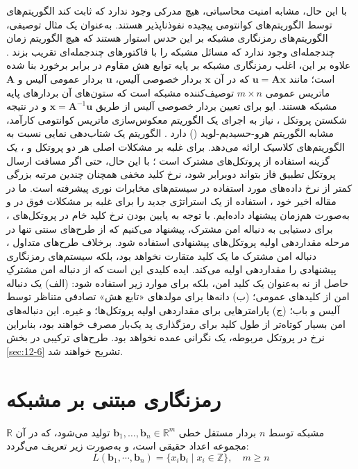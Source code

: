 با این حال، مشابه امنیت محاسباتی، هیچ مدرکی وجود ندارد که ثابت کند الگوریتم‌های  توسط الگوریتم‌های کوانتومی پیچیده نفوذناپذیر هستند. به‌عنوان یک مثال توصیفی، الگوریتم‌های رمزنگاری مشبکه بر این حدس استوار هستند که هیچ الگوریتم زمان چند‌جمله‌ای وجود ندارد که مسائل مشبکه را با فاکتورهای چند‌جمله‌ای تقریب بزند \cite{12-17}. علاوه‌ بر این، اغلب رمزنگاری مشبکه بر پایه توابع هش مقاوم در برابر برخورد بنا شده است؛ مانند $\bm{u} = \bm{A}\bm{x}$ که در آن $\bm{x}$ بردار خصوصی آلیس، $\bm{u}$ بردار عمومی آلیس و $\bm{A}$ ماتریس عمومی $m \times n$ توصیف‌کننده مشبکه است که ستون‌های آن بردارهای پایه مشبکه هستند. ایو برای تعیین بردار خصوصی آلیس از طریق $\bm{x} = \bm{A}^{-1}\bm{u}$ و در نتیجه شکستن پروتکل ، نیاز به اجرای یک الگوریتم معکوس‌سازی ماتریس کوانتومی کارآمد، مشابه الگوریتم هرو-حسیدیم-لوید () دارد \cite{12-20}. الگوریتم  یک شتاب‌دهی نمایی نسبت به الگوریتم‌های کلاسیک ارائه می‌دهد. برای غلبه بر مشکلات اصلی هر دو پروتکل  و ، یک گزینه استفاده از پروتکل‌های مشترک  است \cite{12-21}؛ با این حال، حتی اگر مسافت ارسال پروتکل  تطبیق فاز \cite{12-10} بتواند دوبرابر شود، نرخ کلید مخفی همچنان چندین مرتبه بزرگی کمتر از نرخ داده‌های مورد استفاده در سیستم‌های مخابرات نوری پیشرفته است. ما در مقاله اخیر خود \cite{12-1}، استفاده از یک استراتژی جدید را برای غلبه بر مشکلات فوق در  و  به‌صورت هم‌زمان پیشنهاد داده‌ایم. با توجه به پایین بودن نرخ کلید خام در پروتکل‌های ، برای دستیابی به دنباله امن مشترک، پیشنهاد می‌کنیم که از طرح‌های سنتی  تنها در مرحله مقداردهی اولیه پروتکل‌های پیشنهادی استفاده شود. برخلاف طرح‌های متداول ، دنباله امن مشترک ما یک کلید متقارت نخواهد بود، بلکه سیستم‌های رمزنگاری پیشنهادی را مقداردهی اولیه می‌کند. ایده کلیدی این است که از دنباله امن مشترکِ حاصل از  نه به‌عنوان یک کلید امن، بلکه برای موارد زیر استفاده شود: (الف) یک دنباله امن از کلیدهای عمومی؛ (ب) دانه‌ها برای مولدهای «تابع هش» تصادفی متناظر توسط آلیس و باب؛ (ج) پارامترهایی برای مقداردهی اولیه پروتکل‌ها؛ و غیره. این دنباله‌های امن بسیار کوتاه‌تر از طول کلید برای رمزگذاری پد یک‌بار مصرف خواهند بود، بنابراین نرخ  در پروتکل  مربوطه، یک نگرانی عمده نخواهد بود. طرح‌های ترکیبی  در بخش \ref{sec:12-6} تشریح خواهند شد.






\section{رمزنگاری مبتنی بر مشبکه}
\label{sec:12-2}
مشبکه توسط $n$ بردار مستقل خطی $\bm{b}_1, \dots, \bm{b}_n \in \mathbb{R}^m$ تولید می‌شود، که در آن $\mathbb{R}$ مجموعه اعداد حقیقی است، و به‌صورت زیر تعریف می‌گردد:
\begin{equation}
	L(\bm{b}_1, \cdots, \bm{b}_n) = \{x_i \bm{b}_i \mid x_i \in \mathbb{Z}\}, \quad m \geq n
	\label{eq:12-1}
\end{equation}

